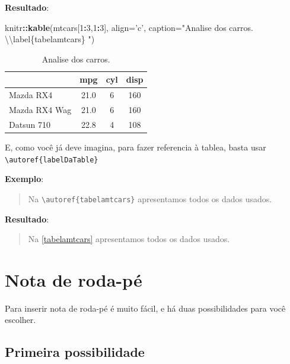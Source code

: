\documentclass[]{book}
\newenvironment{Shaded}{\begin{snugshade}}{\end{snugshade}}
\newcommand{\CharTok}[1]{\textcolor[rgb]{0.31,0.60,0.02}{#1}}
\newcommand{\DataTypeTok}[1]{\textcolor[rgb]{0.13,0.29,0.53}{#1}}
\newcommand{\DecValTok}[1]{\textcolor[rgb]{0.00,0.00,0.81}{#1}}
\newcommand{\KeywordTok}[1]{\textcolor[rgb]{0.13,0.29,0.53}{\textbf{#1}}}
\newcommand{\NormalTok}[1]{#1}
\newcommand{\OperatorTok}[1]{\textcolor[rgb]{0.81,0.36,0.00}{\textbf{#1}}}
\newcommand{\StringTok}[1]{\textcolor[rgb]{0.31,0.60,0.02}{#1}}
\begin{document}
\textbf{Resultado}:

\begin{Shaded}
\begin{Highlighting}[]
\NormalTok{knitr}\OperatorTok{::}\KeywordTok{kable}\NormalTok{(mtcars[}\DecValTok{1}\OperatorTok{:}\DecValTok{3}\NormalTok{,}\DecValTok{1}\OperatorTok{:}\DecValTok{3}\NormalTok{], }\DataTypeTok{align=}\StringTok{'c'}\NormalTok{, }\DataTypeTok{caption=}\StringTok{"Analise dos carros. }\CharTok{\textbackslash{}\textbackslash{}}\StringTok{label\{tabelamtcars\} "}\NormalTok{)}
\end{Highlighting}
\end{Shaded}

\begin{table}

\caption{\label{tab:unnamed-chunk-6}Analise dos carros. \label{tabelamtcars} }
\centering
\begin{tabular}[t]{l|c|c|c}
\hline
  & mpg & cyl & disp\\
\hline
Mazda RX4 & 21.0 & 6 & 160\\
\hline
Mazda RX4 Wag & 21.0 & 6 & 160\\
\hline
Datsun 710 & 22.8 & 4 & 108\\
\hline
\end{tabular}
\end{table}

E, como você já deve imagina, para fazer referencia à tablea, basta usar \texttt{\textbackslash{}autoref\{labelDaTable\}}

\textbf{Exemplo}:

\begin{quote}
Na \texttt{\textbackslash{}autoref\{tabelamtcars\}} apresentamos todos os dados usados.
\end{quote}

\textbf{Resultado}:

\begin{quote}
Na \autoref{tabelamtcars} apresentamos todos os dados usados.
\end{quote}

\hypertarget{nota-de-roda-puxe9}{%
\chapter{Nota de roda-pé}\label{nota-de-roda-puxe9}}

Para inserir nota de roda-pé é muito fácil, e há duas possibilidades para você escolher.

\hypertarget{op1}{%
\section{Primeira possibilidade}\label{op1}}
\end{document}
